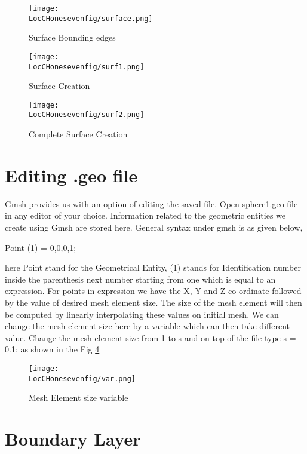 \begin{figure}[h]  
\centering
\texttt{[image: \\LocCHonesevenfig/surface.png]}
\caption{Surface Bounding edges}
\label{surface}
\end{figure}

\begin{figure}[h]  
\centering
\texttt{[image: \\LocCHonesevenfig/surf1.png]}
\caption{Surface Creation}
\label{surf1}
\end{figure}

\begin{figure}[h]  
\centering
\texttt{[image: \\LocCHonesevenfig/surf2.png]}
\caption{Complete Surface Creation}
\label{surf2}
\end{figure}

\section{Editing .geo file}

Gmsh provides us with an option of editing the saved file. Open sphere1.geo file in any editor of your choice. Information related to the geometric entities we create using Gmsh are stored here. General syntax under gmsh is as given below,\newline

\centering Point (1) = {0,0,0,1}; \newline

\flushleft here Point stand for the Geometrical Entity, (1) stands for Identification number inside the parenthesis next number starting from one which is equal to an expression. For points in expression we have the X, Y and Z co-ordinate followed by the value of desired mesh element size. The size of the mesh element will then be computed by linearly interpolating these values on initial mesh. We can change the mesh element size here by a variable which can then take different value. Change the mesh element size from 1 to s and on top of the file type s = 0.1; as shown in the Fig \ref{var}

\begin{figure}[h]  
\centering
\texttt{[image: \\LocCHonesevenfig/var.png]}
\caption{Mesh Element size variable}
\label{var}
\end{figure}

\section{Boundary Layer}

